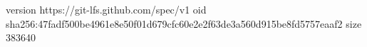 version https://git-lfs.github.com/spec/v1
oid sha256:47fadf500be4961e8e50f01d679cfc60e2e2f63de3a560d915be8fd5757eaaf2
size 383640
